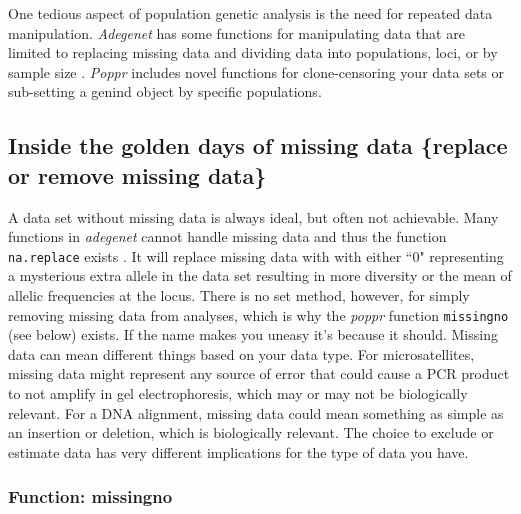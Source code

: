 \documentclass[letterpaper]{article}
\newcommand{\tab}{\hspace*{1em}}
\begin{document}
\tab\tab One tedious aspect of population genetic analysis is the need for repeated data manipulation. \textit{Adegenet} has some functions for manipulating data that are limited to replacing missing data and dividing data into populations, loci, or by sample size \cite{Jombart:2008}. \textit{Poppr} includes novel functions for clone-censoring your data sets or sub-setting a genind object by specific populations.
\subsection{Inside the golden days of missing data \{replace or remove missing data\}}\label{data.manip:missing}

\tab\tab A data set without missing data is always ideal, but often not achievable. Many functions in \textit{adegenet} cannot handle missing data and thus the function \texttt{na.replace} exists \cite{Jombart:2008}. It will replace missing data with with either ``0" representing a mysterious extra allele in the data set resulting in more diversity or the mean of allelic frequencies at the locus. There is no set method, however, for simply removing missing data from analyses, which is why the \textit{poppr} function \texttt{missingno} (see below) exists. If the name makes you uneasy it's because it should. Missing data can mean different things based on your data type. For microsatellites, missing data might represent any source of error that could cause a PCR product to not amplify in gel electrophoresis, which may or may not be biologically relevant. For a DNA alignment, missing data could mean something as simple as an insertion or deletion, which is biologically relevant. The choice to exclude or estimate data has very different implications for the type of data you have.
\subsubsection{Function: missingno}\label{data.manip:missing:missingno}
\end{document}
